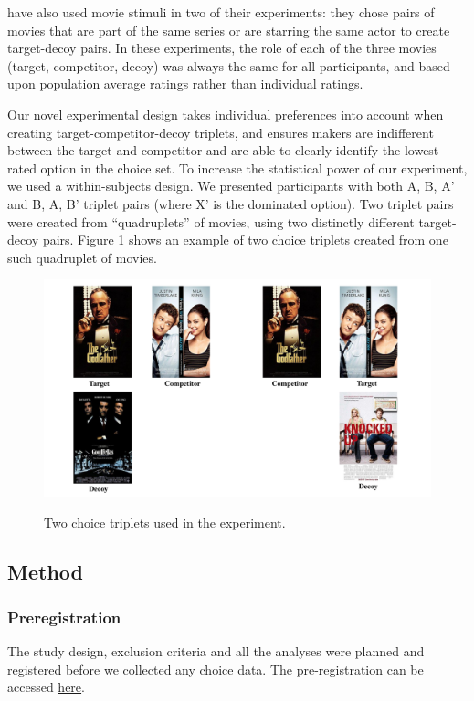 \documentclass[12pt, a4paper]{article}
\begin{document}
  have also used movie stimuli in two of their experiments: they chose pairs of movies that are part of the same series or are starring the same actor to create target-decoy pairs. In these experiments, the role of each of the three movies (target, competitor, decoy) was always the same for all participants, and based upon population average ratings rather than individual ratings.




Our novel experimental design takes individual preferences into account when creating target-competitor-decoy triplets, and ensures makers are indifferent between the target and competitor and are able to clearly identify the lowest-rated option in the choice set. To increase the statistical power of our experiment, we used a within-subjects design. We presented participants with both A, B, A' and B, A, B' triplet pairs (where X' is the dominated option). Two triplet pairs were created from ``quadruplets'' of movies, using two distinctly different target-decoy pairs. Figure \ref{fig:quadruplets} shows an example of two choice triplets created from one such quadruplet of movies.


\begin{figure}
\centering
		 \caption{Two choice triplets used in the experiment.}
\includegraphics[width=1\textwidth]{figure1.pdf}
\label{fig:quadruplets}
\end{figure}

\subsection*{Method}

\subsubsection*{Preregistration}
The study design, exclusion criteria and all the analyses were planned and registered before we collected any choice data. The pre-registration can be accessed \href{https://osf.io/fme6c/?view_only=31da4193689f4247a76af93b2f98fcef}{here}.
\end{document}
